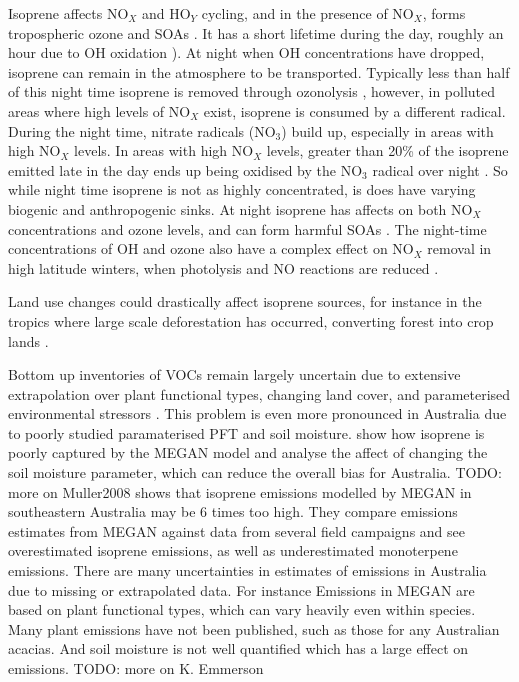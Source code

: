     Isoprene affects NO$_X$ and HO$_Y$ cycling, and in the presence of NO$_X$, forms tropospheric ozone and SOAs \citep{Wagner2002, Millet2006}.
    It has a short lifetime during the day, roughly an hour due to OH oxidation \citep{AtkinsonArey2003}).
    At night when OH concentrations have dropped, isoprene can remain in the atmosphere to be transported. 
    Typically less than half of this night time isoprene is removed through ozonolysis \citep{AtkinsonArey2003}, however, in polluted areas where high levels of NO$_X$ exist, isoprene is consumed by a different radical.
    During the night time, nitrate radicals (NO$_3$) build up, especially in areas with high NO$_X$ levels.
    In areas with high NO$_X$ levels, greater than 20\% of the isoprene emitted late in the day ends up being oxidised by the NO$_3$ radical over night \citep{Brown2009}.
    So while night time isoprene is not as highly concentrated, is does have varying biogenic and anthropogenic sinks.
    At night isoprene has affects on both NO$_X$ concentrations and ozone levels, and can form harmful SOAs \citep{Brown2009, Mao2013}.
    The night-time  concentrations of OH and ozone also have a complex effect on NO$_X$ removal in high latitude winters, when photolysis and NO reactions are reduced \citep{Ayers2006}.
    
    Land use changes could drastically affect isoprene sources, for instance in the tropics where large scale deforestation has occurred, converting forest into crop lands \citep{Kanakidou2005}.
    
    Bottom up inventories of VOCs remain largely uncertain due to extensive extrapolation over plant functional types, changing land cover, and parameterised environmental stressors \citep{Guenther2000,Kanakidou2005}.
    This problem is even more pronounced in Australia due to poorly studied paramaterised PFT and soil moisture.
    \cite{Muller2008} show how isoprene is poorly captured by the MEGAN model and analyse the affect of changing the soil moisture parameter, which can reduce the overall bias for Australia.
    TODO: more on Muller2008
    \cite{Emmerson2016} shows that isoprene emissions modelled by MEGAN in southeastern Australia may be 6 times too high. 
    They compare emissions estimates from MEGAN against data from several field campaigns and see overestimated isoprene emissions, as well as underestimated monoterpene emissions.
    There are many uncertainties in estimates of emissions in Australia due to missing or extrapolated data.
    For instance Emissions in MEGAN are based on plant functional types, which can vary heavily even within species.
    Many plant emissions have not been published, such as those for any Australian acacias.
    And soil moisture is not well quantified which has a large effect on emissions.
    TODO: more on K. Emmerson
    

